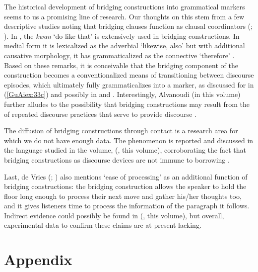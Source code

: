 \documentclass[output=paper]{LSP/langsci}
\begin{document}
The historical development of bridging constructions into grammatical markers seems to us a promising line of research. Our thoughts on this  stem from a few descriptive studies noting that bridging clauses function as clausal coordinators (\citealt[][314]{bromley81}; \citealt[][1327]{Jendraschek09}). In , the  \textit{kwan} `do like that' is extensively used in bridging constructions. In medial form it is lexicalized as the adverbial `likewise, also' but with additional causative morphology, it has grammaticalized as the connective `therefore' \citep[][29]{christensen13}. Based on these remarks, it is conceivable that the bridging component of the construction becomes a conventionalized means of transitioning between discourse episodes, which ultimately fully grammaticalizes into a  marker, as discussed for  in (\ref{GuAiex:33c}) and possibly in  \citep[][909, 913]{seifart10} and  \citep[][376--377]{devries.2005}. Interestingly, Alvanoudi (in this volume) further alludes to the possibility that bridging constructions may result from the  of repeated discourse practices that serve to provide discourse . 

The diffusion of bridging constructions through contact is a research area for which we do not have enough data. The phenomenon is reported and discussed in the  language studied in the volume,  (\citeauthor{emlen18}, this volume), corroborating the fact that bridging constructions as discourse devices are not immune to borrowing \citep[][15, 17]{aikhenvald2006}.                           

Last, de Vries (\citeyear[][378]{devries.2005}; \citeyear[][817]{devries.2006}) also mentions `ease of processing' as an additional function of bridging constructions: the bridging construction allows the speaker to hold the floor long enough to process their next  move and gather his/her thoughts too, and it gives listeners time to process the information of the paragraph it follows. Indirect evidence could possibly be found in  (\citeauthor{guerinchap18}, this volume), but overall, experimental data to confirm these claims are at present lacking.

\section*{Appendix}
\end{document}
